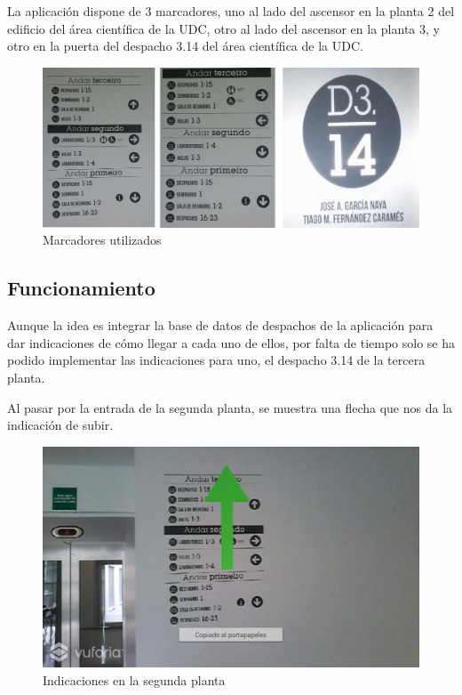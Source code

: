 \documentclass[12pt, a4paper, titlepage]{article}
\begin{document}
La aplicación dispone de 3 marcadores, uno al lado del ascensor en la planta 2 del edificio del área científica de la UDC, otro al lado del ascensor en la planta 3, y otro en la puerta del despacho 3.14 del área científica de la UDC.

\begin{figure}[h!]
	\begin{center}
		\includegraphics[width=15cm]{img/marcadores.png}
		\caption{Marcadores utilizados}
	\end{center}
\end{figure}

\clearpage
\subsection{Funcionamiento}

Aunque la idea es integrar la base de datos de despachos de la aplicación para dar indicaciones de cómo llegar a cada uno de ellos, por falta de tiempo solo se ha podido implementar las indicaciones para uno, el despacho 3.14 de la tercera planta.

Al pasar por la entrada de la segunda planta, se muestra una flecha que nos da la indicación de subir.

	\begin{figure}[h!]
		\begin{center}
			\includegraphics[width=13cm]{img/flechaarriba.png}
			\caption{Indicaciones en la segunda planta}
		\end{center}
	\end{figure}
	
\end{document}
